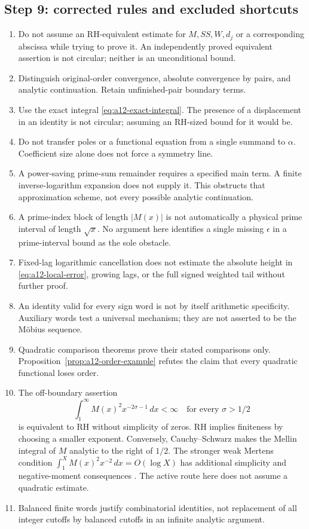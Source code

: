 \documentclass[11pt]{amsart}
\numberwithin{equation}{section}
\theoremstyle{plain}
\theoremstyle{definition}
\theoremstyle{remark}
\begin{document}
\subsection{Step 9: corrected rules and excluded shortcuts}
\label{subsec:a12-rules}
\begin{enumerate}[label=\textup{R\arabic*.},leftmargin=*]
\item Do not assume an RH-equivalent estimate for $M,SS,W,d_j$ or a
corresponding abscissa while trying to prove it. An independently proved
equivalent assertion is not circular; neither is an unconditional bound.
\item Distinguish original-order convergence, absolute convergence by
pairs, and analytic continuation. Retain unfinished-pair boundary terms.
\item Use the exact integral \eqref{eq:a12-exact-integral}. The presence of
a displacement in an identity is not circular; assuming an RH-sized
bound for it would be.
\item Do not transfer poles or a functional equation from a single
summand to $\alpha$. Coefficient size alone does not force a symmetry line.
\item A power-saving prime-sum remainder requires a specified main term.
A finite inverse-logarithm expansion does not supply it. This obstructs
that approximation scheme, not every possible analytic continuation.
\item A prime-index block of length $|M(x)|$ is not automatically a
physical prime interval of length $\sqrt x$. No argument here identifies
a single missing $\epsilon$ in a prime-interval bound as the sole obstacle.
\item Fixed-lag logarithmic cancellation does not estimate the absolute
height in \eqref{eq:a12-local-error}, growing lags, or the full signed
weighted tail without further proof.
\item An identity valid for every sign word is not by itself arithmetic
specificity. Auxiliary words test a universal mechanism; they are not
asserted to be the M\"obius sequence.
\item Quadratic comparison theorems prove their stated comparisons only.
Proposition~\ref{prop:a12-order-example} refutes the claim that every
quadratic functional loses order.
\item The off-boundary assertion
\begin{equation}
\label{eq:a12-L2-correction}
\int_1^\infty M(x)^2x^{-2\sigma-1}\,dx<\infty
\quad\text{for every }\sigma>1/2
\end{equation}
is equivalent to RH without simplicity of zeros. RH implies finiteness
by choosing a smaller exponent. Conversely, Cauchy--Schwarz makes the
Mellin integral of $M$ analytic to the right of $1/2$.
The stronger weak Mertens condition
$\int_1^X M(x)^2x^{-2}\,dx=O(\log X)$ has additional simplicity and
negative-moment consequences \cite{Ng2004}.
The active route here does not assume a quadratic estimate.
\item Balanced finite words justify combinatorial identities, not
replacement of all integer cutoffs by balanced cutoffs in an infinite
analytic argument.
\end{enumerate}
\end{document}
